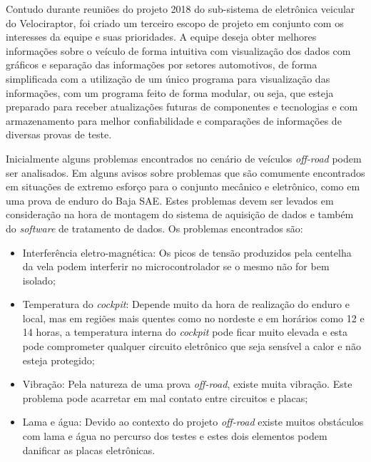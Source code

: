 Contudo durante reuniões do projeto 2018 do sub-sistema de eletrônica veicular do Velociraptor, foi criado um terceiro escopo de projeto em conjunto com os interesses da equipe e suas prioridades.   
A equipe deseja obter melhores informações sobre o veículo de forma intuitiva com visualização dos dados com gráficos e separação das informações por setores automotivos, de forma simplificada com a utilização de um único programa para visualização das informações, com um programa feito de forma modular, ou seja, que esteja preparado para receber atualizações futuras de componentes e tecnologias e com armazenamento para melhor confiabilidade e comparações de informações de diversas provas de teste.   

Inicialmente alguns problemas encontrados no cenário de veículos \textit{off-road} podem ser analisados. Em  alguns avisos sobre problemas que são comumente encontrados em situações de extremo esforço para o conjunto mecânico e eletrônico, como em uma prova de enduro do Baja SAE. Estes problemas devem ser levados em consideração na hora de montagem do sistema de aquisição de dados e também do \textit{software} de tratamento de dados. Os problemas encontrados são:

\begin{itemize}
	\item  Interferência eletro-magnética: Os picos de tensão produzidos pela centelha da vela podem interferir no microcontrolador se o mesmo não for bem isolado; 
	\item Temperatura do \textit{cockpit}: Depende muito da hora de realização do enduro e local, mas em regiões mais quentes como no nordeste e em horários como 12 e 14 horas, a temperatura interna do \textit{cockpit} pode ficar muito elevada e esta pode comprometer qualquer circuito eletrônico que seja sensível a calor e não esteja protegido; 
	\item Vibração: Pela natureza de uma prova \textit{off-road}, existe muita vibração. Este problema pode acarretar em mal contato entre circuitos e placas;
	\item Lama e água: Devido ao contexto do projeto \textit{off-road} existe muitos obstáculos com lama e água no percurso dos testes e estes dois elementos podem danificar as placas eletrônicas.
\end{itemize}

